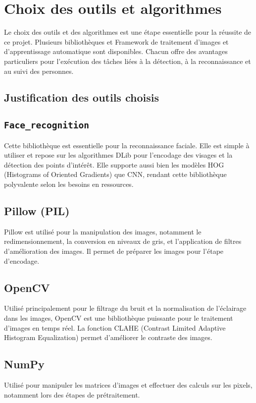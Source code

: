 \documentclass[a4paper,12pt]{report}
\begin{document}
\section{Choix des outils et algorithmes}
Le choix des outils et des algorithmes est une étape essentielle pour la réussite de ce projet. Plusieurs bibliothèques et Framework de traitement d’images et d’apprentissage automatique sont disponibles. Chacun offre des avantages particuliers pour l'exécution des tâches liées à la détection, à la reconnaissance et au suivi des personnes.

\subsection{Justification des outils choisis}
\subsection{\texttt{Face\_recognition}}
Cette bibliothèque est essentielle pour la reconnaissance faciale. Elle est simple à utiliser et repose sur les algorithmes DLib pour l'encodage des visages et la détection des points d'intérêt. Elle supporte aussi bien les modèles HOG (Histograms of Oriented Gradients) que CNN, rendant cette bibliothèque polyvalente selon les besoins en ressources.

\subsection{Pillow (PIL)}
Pillow est utilisé pour la manipulation des images, notamment le redimensionnement, la conversion en niveaux de gris, et l'application de filtres d'amélioration des images. Il permet de préparer les images pour l’étape d’encodage.

\subsection{OpenCV}
Utilisé principalement pour le filtrage du bruit et la normalisation de l'éclairage dans les images, OpenCV est une bibliothèque puissante pour le traitement d'images en temps réel. La fonction CLAHE (Contrast Limited Adaptive Histogram Equalization) permet d'améliorer le contraste des images.

\subsection{NumPy}
Utilisé pour manipuler les matrices d'images et effectuer des calculs sur les pixels, notamment lors des étapes de prétraitement.
\end{document}
